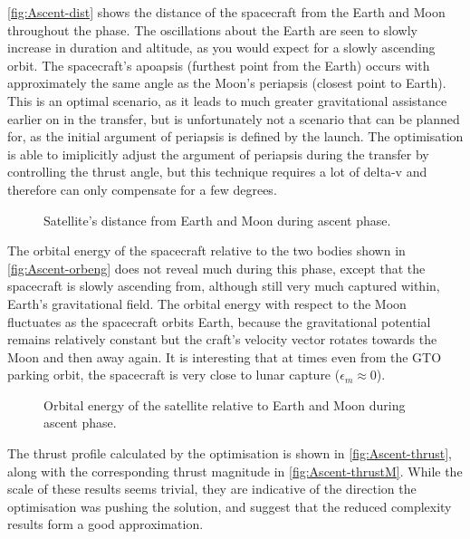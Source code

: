 \autoref{fig:Ascent-dist} shows the distance of the spacecraft from the Earth and Moon throughout the phase. The oscillations about the Earth are seen to slowly increase in duration and altitude, as you would expect for a slowly ascending orbit. The spacecraft's apoapsis (furthest point from the Earth) occurs with approximately the same angle as the Moon's periapsis (closest point to Earth). This is an optimal scenario, as it leads to much greater gravitational assistance earlier on in the transfer, but is unfortunately not a scenario that can be planned for, as the initial argument of periapsis is defined by the launch. The optimisation is able to imiplicitly adjust the argument of periapsis during the transfer by controlling the thrust angle, but this technique requires a lot of delta-v and therefore can only compensate for a few degrees.

\begin{figure}
\caption{Satellite's distance from Earth and Moon during ascent phase.} \label{fig:Ascent-dist}
\centering
\def\svgwidth{\figurewidth}

\end{figure}

The orbital energy of the spacecraft relative to the two bodies shown in \autoref{fig:Ascent-orbeng} does not reveal much during this phase, except that the spacecraft is slowly ascending from, although still very much captured within, Earth's gravitational field. The orbital energy with respect to the Moon fluctuates as the spacecraft orbits Earth, because the gravitational potential remains relatively constant but the craft's velocity vector rotates towards the Moon and then away again. It is interesting that at times even from the GTO parking orbit, the spacecraft is very close to lunar capture ($\epsilon_m\approx0$).

\begin{figure}
\caption{Orbital energy of the satellite relative to Earth and Moon during ascent phase.} \label{fig:Ascent-orbeng}
\centering
\def\svgwidth{\figurewidth}

\end{figure}

The thrust profile calculated by the optimisation is shown in \autoref{fig:Ascent-thrust}, along with the corresponding thrust magnitude in \autoref{fig:Ascent-thrustM}. While the scale of these results seems trivial, they are indicative of the direction the optimisation was pushing the solution, and suggest that the reduced complexity results form a good approximation. 

